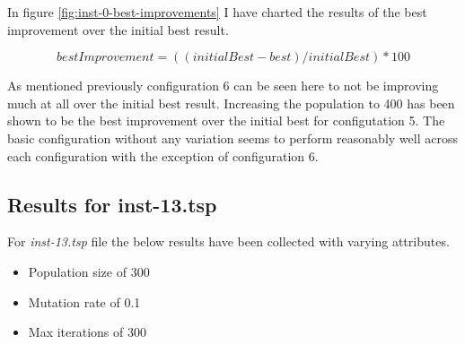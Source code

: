 In figure \ref{fig:inst-0-best-improvements} I have charted the results of the best improvement over the initial best result. 

\begin{equation}\label{eq:3sat-original-formula}
bestImprovement = ((initialBest - best) / initialBest) * 100
\end{equation}

As mentioned previously configuration 6 can be seen here to not be improving much at all over the initial best result. Increasing the population to 400 has been shown to be the best improvement over the initial best for configutation 5. The basic configuration without any variation seems to perform reasonably well across each configuration with the exception of configuration 6.

\subsection{Results for inst-13.tsp}

For \textit{inst-13.tsp} file the below results have been collected with varying attributes.

\begin{itemize}
  \item Population size of 300
  \item Mutation rate of 0.1
  \item Max iterations of 300
\end{itemize}

